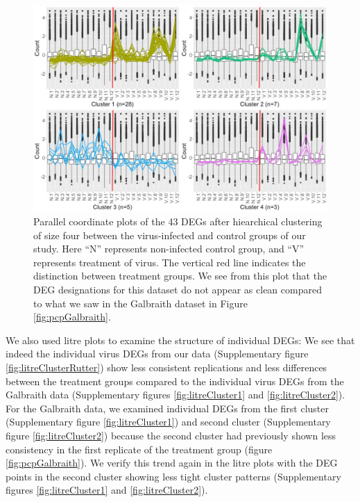 \documentclass[11pt,a4paper,oldfontcommands,openany]{memoir}
\numberwithin{equation}{section} %
\begin{document}
\begin{figure}[H]
\centering
\begin{framed}
  \includegraphics[width=\textwidth]{Images/N_V_4.png}
  \end{framed}
  \caption{Parallel coordinate plots of the 43 DEGs after hiearchical clustering of size four between the virus-infected and control groups of our study. Here ``N'' represents non-infected control group, and ``V'' represents treatment of virus. The vertical red line indicates the distinction between treatment groups. We see from this plot that the DEG designations for this dataset do not appear as clean compared to what we saw in the Galbraith dataset in Figure \ref{fig:pcpGalbraith}.}
  \label{fig:pcpRutterVirus}
\end{figure}

We also used litre plots to examine the structure of individual DEGs: We see that indeed the individual virus DEGs from our data (Supplementary figure \ref{fig:litreClusterRutter}) show less consistent replications and less differences between the treatment groups compared to the individual virus DEGs from the Galbraith data (Supplementary figures \ref{fig:litreCluster1} and \ref{fig:litreCluster2}). For the Galbraith data, we examined individual DEGs from the first cluster (Supplementary figure \ref{fig:litreCluster1}) and second cluster (Supplementary figure \ref{fig:litreCluster2}) because the second cluster had previously shown less consistency in the first replicate of the treatment group (figure \ref{fig:pcpGalbraith}). We verify this trend again in the litre plots with the DEG points in the second cluster showing less tight cluster patterns (Supplementary figures \ref{fig:litreCluster1} and \ref{fig:litreCluster2}).
\end{document}
